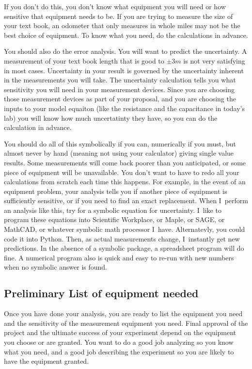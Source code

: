 If you don't do this, you don't know what equipment you will need or how sensitive that equipment needs to be. If you are trying to measure the size of your text book, an odometer that only measures in whole miles may not be the best choice of equipment. To know what you need, do the calculations in advance.

You should also do the error analysis. You will want to predict the uncertainty. A measurement of your text book length that is good to $\pm 3\unit{m}$ is not very satisfying in most cases. Uncertainty in your result is governed by the uncertainty inherent in the measurements you will take. The uncertainty calculation tells you what sensitivity you will need in your measurement devices. Since you are choosing those measurement devices as part of your proposal, and you are choosing the inputs to your model equaiton (like the resistance and the capacitance in today's lab) you will know how much uncertatinty they have, so you can do the calculation in advance.

You should do all of this symbolically if you can, numerically if you must, but almost never by hand (meaning not using your calculator) giving single value results. Some measurements will come back poorer than you anticipated, or some piece of equipment will be unavailable. You don't want to have to redo all your calculations from scratch each time this happens. For example, in the event of an equipment problem, your analysis tells you if another piece of equipment is sufficiently sensitive, or if you need to find an exact replacement. When I\ perform an analysis like this, try for a symbolic equation for uncertainty. I\ like to program these equations into Scientific
Workplace, or Maple, or SAGE, or MathCAD, or whatever symbolic math processor I\ have. Alternatevly, you could code it into Python. Then, as actual measurements change, I\ instantly get new predictions. In the absence of a symbolic package, a spreadsheet program will do fine. A numerical program also is quick and easy to re-run with new numbers when no symbolic answer is found.

\subsection{Preliminary List of equipment needed}

Once you have done your analysis, you are ready to list the equipment you need and the sensitivity of the measurement equipment you need. Final approval of the project and the ultimate success of your experiment depend on the equipment you choose or are granted. You want to do a good job analyzing so you know what you need, and a good job describing the experiment so you are likely to have the equipment granted.

